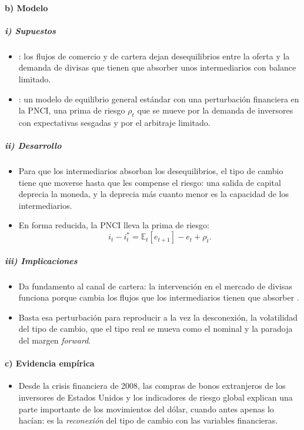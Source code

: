 \documentclass[11pt]{article}
\begin{document}
\paragraph{b) Modelo}
\subparagraph{i) Supuestos}
\begin{itemize}
\item \textcite{GabaixMaggiori2015}: los flujos de comercio y de cartera dejan desequilibrios entre la oferta y la demanda de divisas que tienen que absorber unos intermediarios con balance limitado.
\item \textcite{ItskhokiMukhin2021}: un modelo de equilibrio general estándar con una perturbación financiera en la PNCI, una prima de riesgo $\rho_t$ que se mueve por la demanda de inversores con expectativas sesgadas y por el arbitraje limitado.
\end{itemize}

\subparagraph{ii) Desarrollo}
\begin{itemize}
\item Para que los intermediarios absorban los desequilibrios, el tipo de cambio tiene que moverse hasta que les compense el riesgo: una salida de capital deprecia la moneda, y la deprecia más cuanto menor es la capacidad de los intermediarios.
\item En forma reducida, la PNCI lleva la prima de riesgo:
  \begin{equation}\label{eq:pnci-prima}
  i_t-i^{*}_t=\mathbb{E}_t[e_{t+1}]-e_t+\rho_t .
  \end{equation}
\end{itemize}

\subparagraph{iii) Implicaciones}
\begin{itemize}
\item Da fundamento al canal de cartera: la intervención en el mercado de divisas funciona porque cambia los flujos que los intermediarios tienen que absorber .
\item Basta esa perturbación para reproducir a la vez la desconexión, la volatilidad del tipo de cambio, que el tipo real se mueva como el nominal y la paradoja del margen \emph{forward}.
\end{itemize}

\paragraph{c) Evidencia empírica}
\begin{itemize}
\item Desde la crisis financiera de 2008, las compras de bonos extranjeros de los inversores de Estados Unidos y los indicadores de riesgo global explican una parte importante de los movimientos del dólar, cuando antes apenas lo hacían: es la \emph{reconexión} del tipo de cambio con las variables financieras\nocite{LilleyEtAl2022}.
\end{itemize}
\end{document}

